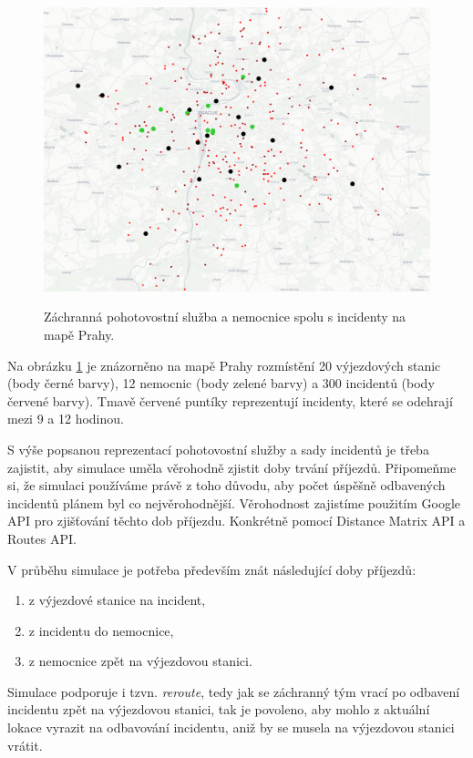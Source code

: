 \begin{figure}[H]
  \caption{Záchranná pohotovostní služba a nemocnice spolu s incidenty na mapě Prahy.}
  \includegraphics[width=\textwidth]{img/prague_monday_420.png}
  \centering
  \label{img:prague}
\end{figure}

Na obrázku \ref{img:prague} je znázorněno na mapě Prahy rozmístění 20 výjezdových stanic (body černé barvy), 12 nemocnic (body zelené barvy) a 300 incidentů (body červené barvy).
Tmavě červené puntíky reprezentují incidenty, které se odehrají mezi 9 a 12 hodinou.

S výše popsanou reprezentací pohotovostní služby a sady incidentů je třeba zajistit, aby simulace uměla věrohodně zjistit doby trvání příjezdů.
Připomeňme si, že simulaci používáme právě z toho důvodu, aby počet úspěšně odbavených incidentů plánem byl co nejvěrohodnější.
Věrohodnost zajistíme použitím Google API pro zjišťování těchto dob příjezdu. Konkrétně pomocí Distance Matrix API a Routes API.

V průběhu simulace je potřeba především znát následující doby příjezdů:
\begin{enumerate}
  \item z výjezdové stanice na incident,
  \item z incidentu do nemocnice,
  \item z nemocnice zpět na výjezdovou stanici.
\end{enumerate}

Simulace podporuje i tzvn. \textit{reroute}, tedy jak se záchranný tým vrací po odbavení incidentu zpět na výjezdovou stanici,
tak je povoleno, aby mohlo z aktuální lokace vyrazit na odbavování incidentu, aniž by se musela na výjezdovou stanici vrátit.

